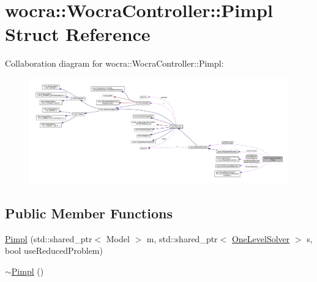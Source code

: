 \hypertarget{structwocra_1_1WocraController_1_1Pimpl}{}\section{wocra\+:\+:Wocra\+Controller\+:\+:Pimpl Struct Reference}
\label{structwocra_1_1WocraController_1_1Pimpl}


Collaboration diagram for wocra\+:\+:Wocra\+Controller\+:\+:Pimpl\+:\nopagebreak
\begin{figure}[H]
\begin{center}
\leavevmode
\includegraphics[width=350pt]{d8/d8f/structwocra_1_1WocraController_1_1Pimpl__coll__graph}
\end{center}
\end{figure}
\subsection*{Public Member Functions}
\begin{DoxyCompactItemize}
\item 
\hyperlink{structwocra_1_1WocraController_1_1Pimpl_ae9e38baadd765c1005354808ea768800}{Pimpl} (std\+::shared\+\_\+ptr$<$ Model $>$ m, std\+::shared\+\_\+ptr$<$ \hyperlink{classocra_1_1OneLevelSolver}{One\+Level\+Solver} $>$ s, bool use\+Reduced\+Problem)
\item 
\hyperlink{structwocra_1_1WocraController_1_1Pimpl_a9e7ca6582122e345e4d51d30ed481450}{$\sim$\+Pimpl} ()
\end{DoxyCompactItemize}
